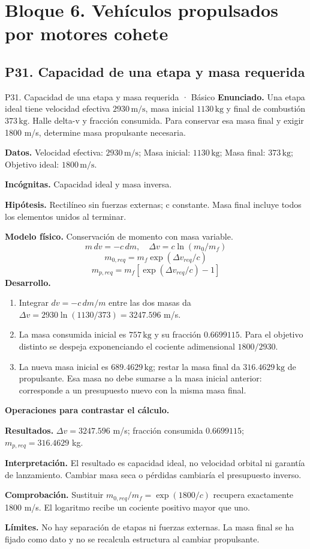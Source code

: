 \chapter{Bloque 6. Vehículos propulsados por motores cohete}
\section{P31. Capacidad de una etapa y masa requerida}
\begin{studiumworked}{P31. Capacidad de una etapa y masa requerida · Básico}
\textbf{Enunciado.} Una etapa ideal tiene velocidad efectiva $2930\,\mathrm{m/s}$, masa inicial $1130\,\mathrm{kg}$ y final de combustión $373\,\mathrm{kg}$. Halle delta-v y fracción consumida. Para conservar esa masa final y exigir 1800 m/s, determine masa propulsante necesaria.

\textbf{Datos.} Velocidad efectiva: $2930\,\mathrm{m/s}$; Masa inicial: $1130\,\mathrm{kg}$; Masa final: $373\,\mathrm{kg}$; Objetivo ideal: $1800\,\mathrm{m/s}$.

\textbf{Incógnitas.} Capacidad ideal y masa inversa.

\textbf{Hipótesis.} Rectilíneo sin fuerzas externas; c constante. Masa final incluye todos los elementos unidos al terminar.

\textbf{Modelo físico.} Conservación de momento con masa variable.
\[m\,dv=-c\,dm,\quad \Delta v=c\ln(m_0/m_f)\]
\[m_{0,req}=m_f\exp(\Delta v_{req}/c)\]
\[m_{p,req}=m_f[\exp(\Delta v_{req}/c)-1]\]
\textbf{Desarrollo.}
\begin{enumerate}
\item Integrar $dv=-c\,dm/m$ entre las dos masas da $\Delta v=2930\ln(1130/373)=3247.596$ m/s.
\item La masa consumida inicial es $757\,\mathrm{kg}$ y su fracción $0.6699115$. Para el objetivo distinto se despeja exponenciando el cociente adimensional $1800/2930$.
\item La nueva masa inicial es $689.4629\,\mathrm{kg}$; restar la masa final da $316.4629\,\mathrm{kg}$ de propulsante. Esa masa no debe sumarse a la masa inicial anterior: corresponde a un presupuesto nuevo con la misma masa final.
\end{enumerate}
\textbf{Operaciones para contrastar el cálculo.}

\textbf{Resultados.} $\Delta v=3247.596$ m/s; fracción consumida $0.6699115$; $m_{p,req}=316.4629$ kg.

\textbf{Interpretación.} El resultado es capacidad ideal, no velocidad orbital ni garantía de lanzamiento. Cambiar masa seca o pérdidas cambiaría el presupuesto inverso.

\textbf{Comprobación.} Sustituir $m_{0,req}/m_f=\exp(1800/c)$ recupera exactamente 1800 m/s. El logaritmo recibe un cociente positivo mayor que uno.

\textbf{Límites.} No hay separación de etapas ni fuerzas externas. La masa final se ha fijado como dato y no se recalcula estructura al cambiar propulsante.
\end{studiumworked}

